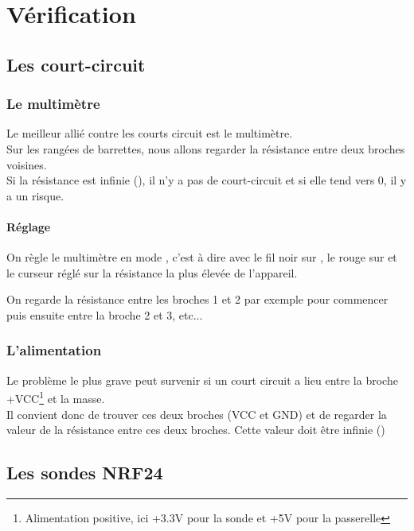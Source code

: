 \chapter{Vérification}

\section{Les court-circuit}

\subsection{Le multimètre} 

Le meilleur allié contre les courts circuit est le multimètre.\\
Sur les rangées de barrettes, nous allons regarder la résistance entre deux broches voisines. \\
Si la résistance est infinie (), il n'y a pas de court-circuit et si elle tend vers 0, il y a un risque.

\subsubsection{Réglage}

On règle le multimètre en mode , c'est à dire avec le fil noir sur , le rouge sur \bold{$\Omega$} et le curseur réglé sur la résistance la plus élevée de l'appareil.


On regarde la résistance entre les broches 1 et 2 par exemple pour commencer puis ensuite entre la broche 2 et 3, etc...



\subsection{L'alimentation} 

Le problème le plus grave peut survenir si un court circuit a lieu entre la broche +VCC\footnote{Alimentation positive, ici +3.3V pour la sonde et +5V pour la passerelle}
et la masse.\\
Il convient donc de trouver ces deux broches (VCC et GND) et de regarder la valeur de la résistance entre ces deux broches.
Cette valeur doit être infinie ()

\section{Les sondes NRF24}

